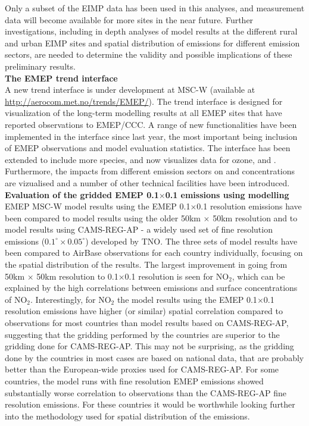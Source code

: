 Only a subset of the EIMP data has been used in this analyses, and measurement data will become available for more sites in the near future. Further investigations, including in depth analyses of model results at the different rural and urban EIMP sites and spatial distribution of emissions for different emission sectors, are needed to determine the validity and possible implications of these preliminary results.
\\


\noindent
\textbf{The EMEP trend interface}\\ %
A new trend interface is under development at MSC-W (available at \url{http://aerocom.met.no/trends/EMEP/}). The trend interface is designed for visualization of the
long-term modelling results at all EMEP sites that have reported observations to EMEP/CCC. A range of new functionalities have been implemented in the interface since last year, the most important being inclusion of EMEP observations and model evaluation statistics. The interface has been extended to include more
species, and now visualizes data for ozone, \PM[10] and \PM[2.5]. Furthermore, the impacts from different
emission sectors on \PM[10] and \PM[2.5] concentrations are vizualised
and a number of other technical facilities have been introduced.\\

\noindent
\textbf{Evaluation of the gridded EMEP 0.1{\degrees}$\times$0.1{\degrees} emissions using modelling}\\%
EMEP MSC-W model results using the EMEP 0.1{\degrees}$\times$0.1{\degrees} resolution emissions have been compared to model results using the older 50km $\times$ 50km resolution and to model results using CAMS-REG-AP - a widely used set of fine resolution emissions (\ensuremath{0.1^{\circ} \times 0.05^{\circ}}) developed by TNO. The three sets of model results
have been compared to AirBase observations for each country individually, focusing on the spatial distribution of the results. 
The largest improvement in going from 50km $\times$ 50km resolution to  0.1{\degrees}$\times$0.1{\degrees} resolution is seen for NO$_2$, which can be explained by the high correlations between emissions and surface concentrations of NO$_2$. Interestingly,  for NO$_2$ the model results using the EMEP 0.1{\degrees}$\times$0.1{\degrees} resolution emissions have higher (or similar) spatial correlation compared to observations for most countries than model results based on CAMS-REG-AP, suggesting that the gridding performed by the countries are superior to the gridding done for CAMS-REG-AP. This may not be surprising, as the gridding done by the countries in most cases are based on national data, that are probably better than the European-wide proxies used for CAMS-REG-AP. For some countries, the model runs with fine resolution EMEP emissions showed substantially worse
correlation to observations than the CAMS-REG-AP fine resolution emissions. For these countries it would be worthwhile looking further
into the methodology used for spatial distribution of the emissions.\\


